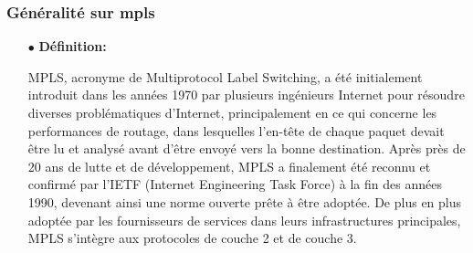 \subsubsection{Généralité sur mpls }
\begin{itemize}
	\item[$\bullet$]\textbf{Définition:} 
	
	MPLS, acronyme de Multiprotocol Label Switching, a été initialement introduit dans les années 1970 par plusieurs ingénieurs Internet pour résoudre diverses problématiques d'Internet, principalement en ce qui concerne les performances de routage, dans lesquelles l'en-tête de chaque paquet devait être lu et analysé avant d'être envoyé vers la bonne destination. Après près de 20 ans de lutte et de développement, MPLS a finalement été reconnu et confirmé par l'IETF (Internet Engineering Task Force) à la fin des années 1990, devenant ainsi une norme ouverte prête à être adoptée. De plus en plus adoptée par les fournisseurs de services dans leurs infrastructures principales, MPLS s'intègre aux protocoles de couche 2 et de couche 3.

\end{itemize}
